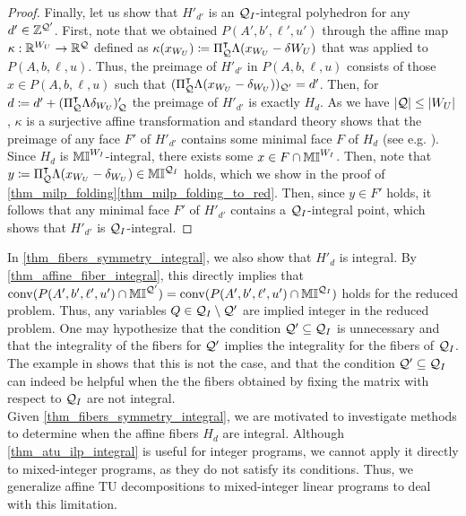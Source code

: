 \documentclass[pdflatex,sn-mathphys-num]{sn-jnl}%
\theoremstyle{thmstyleone}%
\theoremstyle{thmstylethree}%
\theoremstyle{thmstyletwo}%
\newcommand{\conv}{\mathrm{conv}}
\begin{document}
\begin{proof}
    Finally, let us show that $H'_{d'}$ is an $\mathcal{Q}_I$-integral polyhedron for any $d'\in \mathbb{Z}^{\mathcal{Q}'}$.  First, note that we obtained $P(A',b',\ell',u')$ through the affine map $\kappa : \mathbb{R}^{W_U} \to \mathbb{R}^{\mathcal{Q}}$ defined as $\kappa(x_{W_U}) \coloneqq 
    \transpose{\Pi_\MQ} \Lambda (x_{W_U} - \delta{W_U})$ that was applied to $P(A,b,\ell,u)$. Thus, the preimage of $H'_{d'}$ in $P(A,b,\ell,u)$ consists of those $x\in P(A,b,\ell,u)$ such that $(\Pi_{\mathcal{Q}}^{\intercal} \Lambda (x_{W_U} - \delta_{W_U}))_{\mathcal{Q}'} = d'$. Then, for $d \coloneqq d' + (\transpose{\Pi_\MQ} \Lambda \delta_{W_U})_\MQ'$ the preimage of $H'_{d'}$ is exactly $H_d$. 
    As we have $|\mathcal{Q}| \leq |W_U|$, $\kappa$ is a surjective affine transformation and standard theory shows that the preimage of any face $F'$ of $H'_{d'}$ contains some minimal face $F$ of $H_d$ (see e.g. 
    \cite[Lemma 7.10]{Ziegler01}). Since $H_d$ is $\mathbb{MI}^{W_I}$-integral, there exists some $x\in F\cap \mathbb{MI}^{W_I}$. Then, note that $y \coloneqq \transpose{\Pi_\MQ} \Lambda (x_{W_U} - \delta_{W_U}) \in \M^{\MQ_I}$ holds, which we show in the proof of  \cref{thm_milp_folding}\ref{thm_milp_folding_to_red}. Then, since $y\in F'$ holds, it follows that any minimal face $F'$ of $H'_{d'}$ contains a $\mathcal{Q}_I$-integral point, which shows that $H'_{d'}$ is $\mathcal{Q}_I$-integral. 
\end{proof}

In \cref{thm_fibers_symmetry_integral}, we also show that $H'_{d}$ is integral. By \cref{thm_affine_fiber_integral}, this directly implies that $\conv(P(A',b',\ell',u') \cap \M^{\MQ'}) = \conv(P(A',b',\ell',u') \cap \M^{\MQ_I})$ holds for the reduced problem. Thus, any variables $Q\in \mathcal{Q}_I \setminus \mathcal{Q}'$ are implied integer in the reduced problem. 
One may hypothesize that the condition $\mathcal{Q}'\subseteq \mathcal{Q}_I$ is unnecessary and that the integrality of the fibers for $\mathcal{Q}'$ implies the integrality for the fibers of $\mathcal{Q}_I$. The example in  shows that this is not the case, and that the condition $\mathcal{Q}'\subseteq \mathcal{Q}_I$ can indeed be helpful when the the fibers obtained by fixing the matrix with respect to $\mathcal{Q}_I$ are not integral.\\

Given \cref{thm_fibers_symmetry_integral}, we are motivated to investigate methods to determine when the affine fibers $H_d$ are integral.  
Although \cref{thm_atu_ilp_integral} is useful for integer programs, we cannot apply it directly to mixed-integer programs, as they do not satisfy its conditions. Thus, we generalize affine TU decompositions to mixed-integer linear programs to deal with this limitation.
\end{document}
